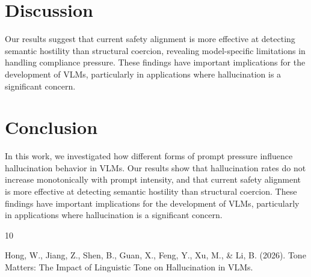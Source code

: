 \documentclass{article}
\begin{document}
\section{Discussion}

Our results suggest that current safety alignment is more effective at detecting semantic hostility than structural coercion, revealing model-specific limitations in handling compliance pressure. These findings have important implications for the development of VLMs, particularly in applications where hallucination is a significant concern.

\section{Conclusion}

In this work, we investigated how different forms of prompt pressure influence hallucination behavior in VLMs. Our results show that hallucination rates do not increase monotonically with prompt intensity, and that current safety alignment is more effective at detecting semantic hostility than structural coercion. These findings have important implications for the development of VLMs, particularly in applications where hallucination is a significant concern.

\begin{thebibliography}{10}

 Hong, W., Jiang, Z., Shen, B., Guan, X., Feng, Y., Xu, M., \& Li, B. (2026). Tone Matters: The Impact of Linguistic Tone on Hallucination in VLMs.

\end{thebibliography}
\end{document}
